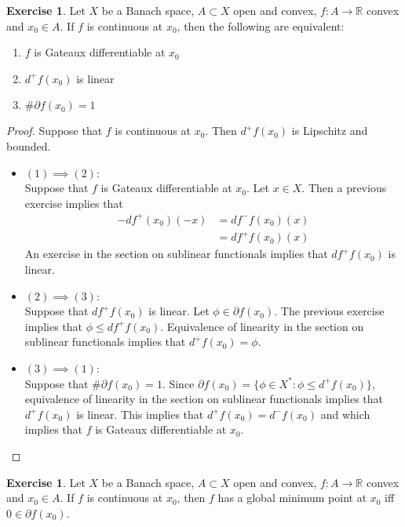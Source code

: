 \documentclass[12pt]{amsart}
\theoremstyle{definition}
\newtheorem{ex}[definition]{Exercise}
\newcommand{\R}{\mathbb{R}}
\newcommand{\p}{\partial}
\begin{document}
	\begin{ex}
	Let $X$ be a Banach space, $A \subset X$ open and convex, $f:A \rightarrow \R$ convex and $x_0 \in A$. If $f$ is continuous at $x_0$, then the following are equivalent:
	\begin{enumerate}
	\item $f$ is Gateaux differentiable at $x_0$    
	\item $d^+f(x_0)$ is linear 
	\item $\# \p f(x_0) = 1$
	\end{enumerate}
	\end{ex}	
	
	\begin{proof}
	Suppose that $f$ is continuous at $x_0$. Then $d^+f(x_0)$ is Lipschitz and bounded.
	\begin{itemize}
	\item $(1) \implies (2)$: \\ 
	Suppose that $f$ is Gateaux differentiable at $x_0$. Let $x \in X$. Then a previous exercise implies that 
	\begin{align*}
	-df^+(x_0)(-x) 
	&= df^-f(x_0)(x) \\
	&= df^+f(x_0)(x)
	\end{align*}
	An exercise in the section on sublinear functionals implies that $df^+f(x_0)$ is linear.
	\item $(2) \implies (3)$: \\  
	Suppose that $df^+f(x_0)$ is linear. Let $\phi \in \p f(x_0)$. The previous exercise implies that $\phi \leq df^+f(x_0)$. Equivalence of linearity in the section on sublinear functionals implies that $d^+f(x_0) = \phi$. 
	\item $(3) \implies (1)$: \\  
	Suppose that $\# \p f(x_0) = 1$. Since $\p f(x_0) = \{ \phi \in X^*: \phi \leq d^+ f(x_0) \}$, equivalence of linearity in the section on sublinear functionals implies that $d^+ f(x_0)$ is linear. This implies that $d^+ f(x_0) = d^- f(x_0)$ and which implies that $f$ is Gateaux differentiable at $x_0$.
	\end{itemize}
	\end{proof}
	
	\begin{ex}
	Let $X$ be a Banach space, $A \subset X$ open and convex, $f:A \rightarrow \R$ convex and $x_0 \in A$. If $f$ is continuous at $x_0$, then $f$ has a global minimum point at $x_0$ iff $0 \in \p f(x_0)$.
	\end{ex}
	
\end{document}
